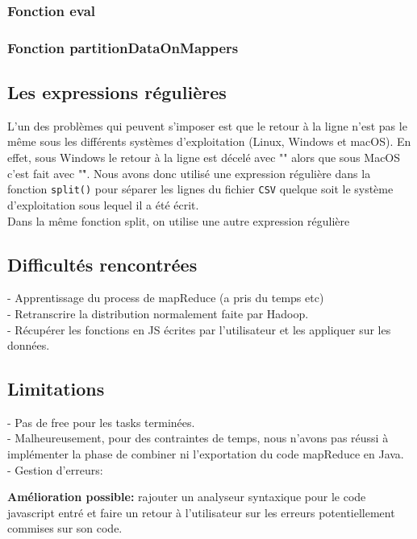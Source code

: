 \subsubsection{Fonction eval}

\subsubsection{Fonction partitionDataOnMappers}



\subsection{Les expressions régulières}

L'un des problèmes qui peuvent s'imposer est que le retour à la ligne n'est pas le même sous les différents systèmes d'exploitation (Linux, Windows et macOS). En effet, sous Windows le retour à la ligne est décelé avec "" alors que sous MacOS c'est fait avec "\r". 	
Nous avons donc utilisé une expression régulière dans la fonction {\tt split()} pour séparer les lignes du fichier {\tt CSV} quelque soit le système d'exploitation sous lequel il a été écrit.\\

Dans la même fonction split, on utilise une autre expression régulière 


\subsection{Difficultés rencontrées}

- Apprentissage du process de mapReduce (a pris du temps etc)\\
- Retranscrire la distribution normalement faite par Hadoop.\\
- Récupérer les fonctions en JS écrites par l'utilisateur et les appliquer sur les données.

\subsection{Limitations}
- Pas de free pour les tasks terminées.\\
- Malheureusement, pour des contraintes de temps, nous n'avons pas réussi à implémenter la phase de combiner ni l'exportation du code mapReduce en Java.\\
- Gestion d'erreurs: 

{\bf Amélioration possible:} rajouter un analyseur syntaxique pour le code javascript entré et faire un retour à l'utilisateur sur les erreurs potentiellement commises sur son code.